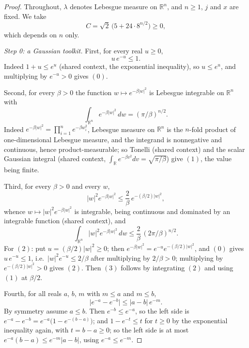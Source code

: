 \begin{proof}
Throughout, $\lambda$ denotes Lebesgue measure on $\mathbb{R}^n$, and $n \geq 1$,
$j$ and $x$ are fixed.  We take
\[
  C = \sqrt2\,\bigl(5 + 24\cdot8^{n/2}\bigr) \geq 0 ,
\]
which depends on $n$ only.

\emph{Step 0: a Gaussian toolkit.}
First, for every real $u \geq 0$,
\begin{equation*}
  u\,e^{-u} \leq 1 . \tag{0}
\end{equation*}
Indeed $1+u \leq e^u$ (shared context, the exponential inequality), so
$u \leq e^u$, and multiplying by $e^{-u} > 0$ gives $(0)$.

Second, for every $\beta > 0$ the function $w \mapsto e^{-\beta|w|^2}$ is
Lebesgue integrable on $\mathbb{R}^n$ with
\begin{equation*}
  \int_{\mathbb{R}^n} e^{-\beta|w|^2}\,dw = (\pi/\beta)^{n/2} . \tag{1}
\end{equation*}
Indeed $e^{-\beta|w|^2} = \prod_{i=1}^n e^{-\beta w_i^2}$, Lebesgue measure on
$\mathbb{R}^n$ is the $n$-fold product of one-dimensional Lebesgue measure, and
the integrand is nonnegative and continuous, hence product-measurable; so
Tonelli (shared context) and the scalar Gaussian integral (shared context,
$\int_{\mathbb{R}}e^{-\beta v^2}dv = \sqrt{\pi/\beta}$) give $(1)$, the value
being finite.

Third, for every $\beta > 0$ and every $w$,
\begin{equation*}
  |w|^2e^{-\beta|w|^2} \leq \frac2\beta\,e^{-(\beta/2)|w|^2} , \tag{2}
\end{equation*}
whence $w \mapsto |w|^2e^{-\beta|w|^2}$ is integrable, being continuous and
dominated by an integrable function (shared context), and
\begin{equation*}
  \int_{\mathbb{R}^n}|w|^2e^{-\beta|w|^2}\,dw
    \leq \frac2\beta\,(2\pi/\beta)^{n/2} . \tag{3}
\end{equation*}
For $(2)$: put $u = (\beta/2)|w|^2 \geq 0$; then
$e^{-\beta|w|^2} = e^{-u}e^{-(\beta/2)|w|^2}$, and $(0)$ gives
$u\,e^{-u} \leq 1$, i.e.\ $|w|^2e^{-u} \leq 2/\beta$ after multiplying by
$2/\beta > 0$; multiplying by $e^{-(\beta/2)|w|^2} > 0$ gives $(2)$.  Then $(3)$
follows by integrating $(2)$ and using $(1)$ at $\beta/2$.

Fourth, for all reals $a$, $b$, $m$ with $m \leq a$ and $m \leq b$,
\begin{equation*}
  \bigl|e^{-a}-e^{-b}\bigr| \leq |a-b|\,e^{-m} . \tag{4}
\end{equation*}
By symmetry assume $a \leq b$.  Then $e^{-b} \leq e^{-a}$, so the left side is
$e^{-a}-e^{-b} = e^{-a}\bigl(1-e^{-(b-a)}\bigr)$; and $1-e^{-t} \leq t$ for
$t \geq 0$ by the exponential inequality again, with $t = b-a \geq 0$; so the
left side is at most $e^{-a}(b-a) \leq e^{-m}|a-b|$, using $e^{-a} \leq e^{-m}$.


\end{proof}
